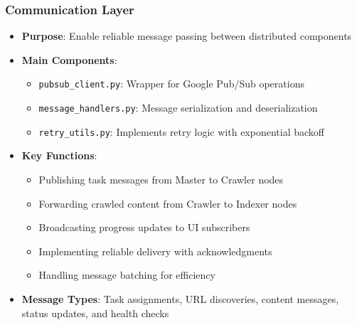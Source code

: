 \documentclass[12pt,a4paper]{report}
\begin{document}
\subsubsection{Communication Layer}
\begin{itemize}
    \item \textbf{Purpose}: Enable reliable message passing between distributed components
    \item \textbf{Main Components}:
    \begin{itemize}
        \item \texttt{pubsub\_client.py}: Wrapper for Google Pub/Sub operations
        \item \texttt{message\_handlers.py}: Message serialization and deserialization
        \item \texttt{retry\_utils.py}: Implements retry logic with exponential backoff
    \end{itemize}
    \item \textbf{Key Functions}:
    \begin{itemize}
        \item Publishing task messages from Master to Crawler nodes
        \item Forwarding crawled content from Crawler to Indexer nodes
        \item Broadcasting progress updates to UI subscribers
        \item Implementing reliable delivery with acknowledgments
        \item Handling message batching for efficiency
    \end{itemize}
    \item \textbf{Message Types}: Task assignments, URL discoveries, content messages, status updates, and health checks
\end{itemize}
\end{document}
